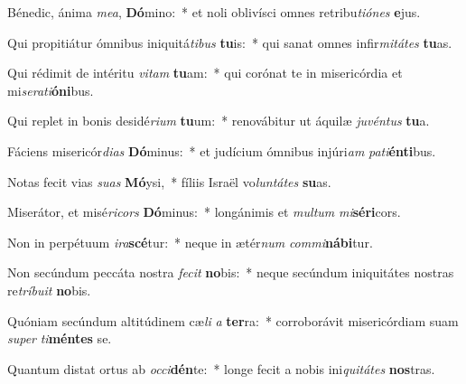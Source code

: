 \item Bénedic, ánima \textit{me}\textit{a}, \textbf{Dó}mino:~* et noli oblivísci omnes retribu\textit{ti}\textit{ó}\textit{nes} \textbf{e}jus.
\item Qui propitiátur ómnibus iniquitá\textit{ti}\textit{bus} \textbf{tu}is:~* qui sanat omnes infir\textit{mi}\textit{tá}\textit{tes} \textbf{tu}as.
\item Qui rédimit de intéritu \textit{vi}\textit{tam} \textbf{tu}am:~* qui corónat te in misericórdia et mi\textit{se}\textit{ra}\textit{ti}\textbf{ó}\textbf{ni}bus.
\item Qui replet in bonis desidé\textit{ri}\textit{um} \textbf{tu}um:~* renovábitur ut áquilæ \textit{ju}\textit{vén}\textit{tus} \textbf{tu}a.
\item Fáciens misericór\textit{di}\textit{as} \textbf{Dó}minus:~* et judícium ómnibus injúri\textit{am} \textit{pa}\textit{ti}\textbf{én}\textbf{ti}bus.
\item Notas fecit vias \textit{su}\textit{as} \textbf{Mó}ysi,~* fíliis Israël vo\textit{lun}\textit{tá}\textit{tes} \textbf{su}as.
\item Miserátor, et misé\textit{ri}\textit{cors} \textbf{Dó}minus:~* longánimis et \textit{mul}\textit{tum} \textit{mi}\textbf{sé}\textbf{ri}cors.
\item Non in perpétuum \textit{i}\textit{ra}\textbf{scé}tur:~* neque in ætér\textit{num} \textit{com}\textit{mi}\textbf{ná}\textbf{bi}tur.
\item Non secúndum peccáta nostra \textit{fe}\textit{cit} \textbf{no}bis:~* neque secúndum iniquitátes nostras re\textit{trí}\textit{bu}\textit{it} \textbf{no}bis.
\item Quóniam secúndum altitúdinem cæ\textit{li} \textit{a} \textbf{ter}ra:~* corroborávit misericórdiam suam \textit{su}\textit{per} \textit{ti}\textbf{mén}\textbf{tes} se.
\item Quantum distat ortus ab \textit{oc}\textit{ci}\textbf{dén}te:~* longe fecit a nobis ini\textit{qui}\textit{tá}\textit{tes} \textbf{nos}tras.
